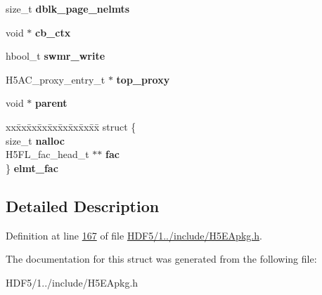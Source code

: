 \begin{DoxyCompactItemize}
\item 
\mbox{\label{struct_h5_e_a__hdr__t_a9782f30c2d4e7033d93236b898014e05}} 
size\+\_\+t {\bfseries dblk\+\_\+page\+\_\+nelmts}
\item 
\mbox{\label{struct_h5_e_a__hdr__t_a4bb5fccc83b8524d2a3d05e7a521aeea}} 
void $\ast$ {\bfseries cb\+\_\+ctx}
\item 
\mbox{\label{struct_h5_e_a__hdr__t_a1c08e8e6bb4e9acbb7069a6353d75eaf}} 
hbool\+\_\+t {\bfseries swmr\+\_\+write}
\item 
\mbox{\label{struct_h5_e_a__hdr__t_a4c236def8d3d6d54d4717dc277ab6257}} 
H5\+A\+C\+\_\+proxy\+\_\+entry\+\_\+t $\ast$ {\bfseries top\+\_\+proxy}
\item 
\mbox{\label{struct_h5_e_a__hdr__t_af7de14b129768668e0e1cd501a68bde4}} 
void $\ast$ {\bfseries parent}
\item 
\mbox{\label{struct_h5_e_a__hdr__t_a93c993e5e1799218cd35f65848f73c78}} 
\begin{tabbing}
xx\=xx\=xx\=xx\=xx\=xx\=xx\=xx\=xx\=\kill
struct \{\\
\>size\_t {\bfseries nalloc}\\
\>H5FL\_fac\_head\_t $\ast$$\ast$ {\bfseries fac}\\
\} {\bfseries elmt\_fac}\\

\end{tabbing}\end{DoxyCompactItemize}


\subsection{Detailed Description}


Definition at line \hyperlink{_h_d_f5_21_810_81_2include_2_h5_e_apkg_8h_source_l00167}{167} of file \hyperlink{_h_d_f5_21_810_81_2include_2_h5_e_apkg_8h_source}{H\+D\+F5/1../include/\+H5\+E\+Apkg.\+h}.



The documentation for this struct was generated from the following file\+:\begin{DoxyCompactItemize}
\item 
H\+D\+F5/1../include/\+H5\+E\+Apkg.\+h\end{DoxyCompactItemize}
